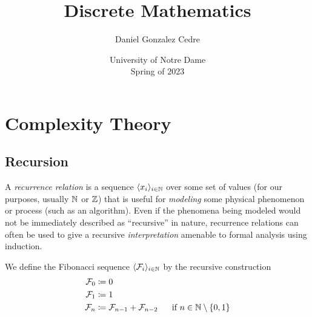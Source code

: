 





\title{Discrete Mathematics}
\author{Daniel Gonzalez Cedre}
\date{University of Notre Dame \\ Spring of 2023}
\maketitle


\setcounter{chapter}{4}
\chapter{Complexity Theory}

\section{Recursion}
\begin{idea}
    A \emph{recurrence relation} is a sequence $\langle x_i\rangle_{i \in \mathbb{N}}$
    over some set of values (for our purposes, usually $\mathbb{N}$ or $\mathbb{Z}$)
    that is useful for \emph{modeling} some physical phenomenon or process (such as an algorithm).
    Even if the phenomena being modeled would not be immediately described as ``recursive'' in nature,
    recurrence relations can often be used to give a recursive \emph{interpretation}
    amenable to formal analysis using induction.
\end{idea}

\begin{definition}
    We define the Fibonacci sequence $\langle\mathcal{F}_i\rangle_{i \in \mathbb{N}}$ by the recursive construction
    \begin{align*}
        \mathcal{F}_0 &\defn 0\\
        \mathcal{F}_1 &\defn 1\\
        \mathcal{F}_n &\defn \mathcal{F}_{n - 1} + \mathcal{F}_{n - 2}
            ~~~~\text{ if } n \in \N \setminus \set*{0, 1}
    \end{align*}
\end{definition}

